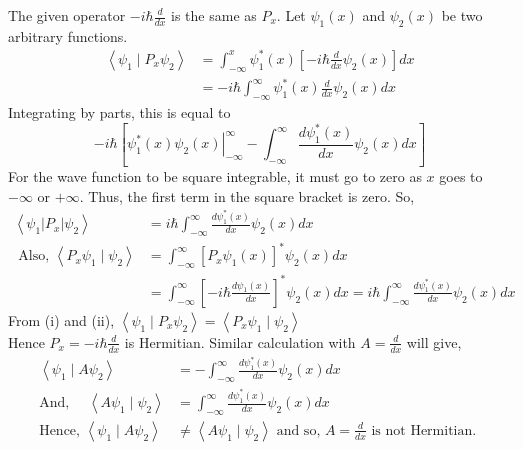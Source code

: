 \begin{answer}
 The given operator $-i \hbar \frac{d}{d x}$ is the same as $P_{x}$. Let $\psi_{1}(x)$ and $\psi_{2}(x)$ be two arbitrary functions.
$$
\begin{aligned}
\left\langle\psi_{1} \mid P_{x} \psi_{2}\right\rangle &=\int_{-\infty}^{x} \psi_{1}^{*}(x)\left[-i \hbar \frac{d}{d x} \psi_{2}(x)\right] d x \\
&=-i \hbar \int_{-\infty}^{\infty} \psi_{1}^{*}(x) \frac{d}{d x} \psi_{2}(x) d x
\end{aligned}
$$
Integrating by parts, this is equal to
$$
-i \hbar\left[\left.\psi_{1}^{*}(x) \psi_{2}(x)\right|_{-\infty} ^{\infty}-\int_{-\infty}^{\infty} \frac{d \psi_{1}^{*}(x)}{d x} \psi_{2}(x) d x\right]
$$
For the wave function to be square integrable, it must go to zero as $x$ goes to $-\infty$ or $+\infty$.
Thus, the first term in the square bracket is zero. So,
$$
\begin{aligned}
\left\langle\psi_{1}\left|P_{x}\right| \psi_{2}\right\rangle&=i \hbar \int_{-\infty}^{\infty} \frac{d \psi_{1}^{*}(x)}{d x} \psi_{2}(x) d x\\
\text { Also, } 
\left\langle P_{x} \psi_{1} \mid \psi_{2}\right\rangle &=\int_{-\infty}^{\infty}\left[P_{x} \psi_{1}(x)\right]^{*} \psi_{2}(x) d x \\
&=\int_{-\infty}^{\infty}\left[-i \hbar \frac{d \psi_{1}(x)}{d x}\right]^{*} \psi_{2}(x) d x=i \hbar \int_{-\infty}^{\infty} \frac{d \psi_{1}^{*}(x)}{d x} \psi_{2}(x) d x
\end{aligned}
$$
From (i) and (ii), $\left\langle\psi_{1} \mid P_{x} \psi_{2}\right\rangle=\left\langle P_{x} \psi_{1} \mid \psi_{2}\right\rangle$\\
Hence $P_{x}=-i \hbar \frac{d}{d x}$ is Hermitian. Similar calculation with $A=\frac{d}{d x}$ will give,
\begin{align*}
\left\langle\psi_{1} \mid A \psi_{2}\right\rangle&=-\int_{-\infty}^{\infty} \frac{d \psi_{1}^{*}(x)}{d x} \psi_{2}(x) d x\\
\text{And, }\quad\left\langle A \psi_{1} \mid \psi_{2}\right\rangle&=\int_{-\infty}^{\infty} \frac{d \psi_{1}^{*}(x)}{d x} \psi_{2}(x) d x\\
\text{Hence, }\left\langle\psi_{1} \mid A \psi_{2}\right\rangle &\neq\left\langle A \psi_{1} \mid \psi_{2}\right\rangle\text{ and so, }A=\frac{d}{d x}\text{ is not Hermitian.	}
\end{align*}



\end{answer}
